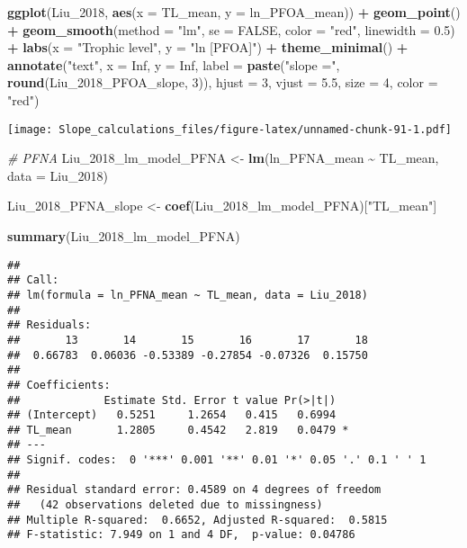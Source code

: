 \documentclass[
]{article}
\newenvironment{Shaded}{\begin{snugshade}}{\end{snugshade}}
\newcommand{\AttributeTok}[1]{\textcolor[rgb]{0.13,0.29,0.53}{#1}}
\newcommand{\CommentTok}[1]{\textcolor[rgb]{0.56,0.35,0.01}{\textit{#1}}}
\newcommand{\ConstantTok}[1]{\textcolor[rgb]{0.56,0.35,0.01}{#1}}
\newcommand{\DecValTok}[1]{\textcolor[rgb]{0.00,0.00,0.81}{#1}}
\newcommand{\FloatTok}[1]{\textcolor[rgb]{0.00,0.00,0.81}{#1}}
\newcommand{\FunctionTok}[1]{\textcolor[rgb]{0.13,0.29,0.53}{\textbf{#1}}}
\newcommand{\NormalTok}[1]{#1}
\newcommand{\OtherTok}[1]{\textcolor[rgb]{0.56,0.35,0.01}{#1}}
\newcommand{\SpecialCharTok}[1]{\textcolor[rgb]{0.81,0.36,0.00}{\textbf{#1}}}
\newcommand{\StringTok}[1]{\textcolor[rgb]{0.31,0.60,0.02}{#1}}
\begin{document}
\begin{Shaded}
\begin{Highlighting}[]
\FunctionTok{ggplot}\NormalTok{(Liu\_2018, }\FunctionTok{aes}\NormalTok{(}\AttributeTok{x =}\NormalTok{ TL\_mean, }\AttributeTok{y =}\NormalTok{ ln\_PFOA\_mean)) }\SpecialCharTok{+}
  \FunctionTok{geom\_point}\NormalTok{() }\SpecialCharTok{+}
  \FunctionTok{geom\_smooth}\NormalTok{(}\AttributeTok{method =} \StringTok{"lm"}\NormalTok{, }\AttributeTok{se =} \ConstantTok{FALSE}\NormalTok{, }\AttributeTok{color =} \StringTok{"red"}\NormalTok{, }\AttributeTok{linewidth =} \FloatTok{0.5}\NormalTok{) }\SpecialCharTok{+}
  \FunctionTok{labs}\NormalTok{(}\AttributeTok{x =} \StringTok{"Trophic level"}\NormalTok{,}
       \AttributeTok{y =} \StringTok{"ln [PFOA]"}\NormalTok{) }\SpecialCharTok{+}
  \FunctionTok{theme\_minimal}\NormalTok{() }\SpecialCharTok{+}
  \FunctionTok{annotate}\NormalTok{(}\StringTok{"text"}\NormalTok{, }\AttributeTok{x =} \ConstantTok{Inf}\NormalTok{, }\AttributeTok{y =} \ConstantTok{Inf}\NormalTok{, }\AttributeTok{label =} \FunctionTok{paste}\NormalTok{(}\StringTok{"slope ="}\NormalTok{, }\FunctionTok{round}\NormalTok{(Liu\_2018\_PFOA\_slope, }\DecValTok{3}\NormalTok{)), }
           \AttributeTok{hjust =} \DecValTok{3}\NormalTok{, }\AttributeTok{vjust =} \FloatTok{5.5}\NormalTok{, }\AttributeTok{size =} \DecValTok{4}\NormalTok{, }\AttributeTok{color =} \StringTok{"red"}\NormalTok{)}
\end{Highlighting}
\end{Shaded}

\texttt{[image: Slope\_calculations\_files/figure-latex/unnamed-chunk-91-1.pdf]}

\begin{Shaded}
\begin{Highlighting}[]
\CommentTok{\# PFNA}
\NormalTok{Liu\_2018\_lm\_model\_PFNA }\OtherTok{\textless{}{-}} \FunctionTok{lm}\NormalTok{(ln\_PFNA\_mean }\SpecialCharTok{\textasciitilde{}}\NormalTok{ TL\_mean,}
                             \AttributeTok{data =}\NormalTok{ Liu\_2018)}

\NormalTok{Liu\_2018\_PFNA\_slope }\OtherTok{\textless{}{-}} \FunctionTok{coef}\NormalTok{(Liu\_2018\_lm\_model\_PFNA)[}\StringTok{"TL\_mean"}\NormalTok{]}

\FunctionTok{summary}\NormalTok{(Liu\_2018\_lm\_model\_PFNA)}
\end{Highlighting}
\end{Shaded}

\begin{verbatim}
## 
## Call:
## lm(formula = ln_PFNA_mean ~ TL_mean, data = Liu_2018)
## 
## Residuals:
##       13       14       15       16       17       18 
##  0.66783  0.06036 -0.53389 -0.27854 -0.07326  0.15750 
## 
## Coefficients:
##             Estimate Std. Error t value Pr(>|t|)  
## (Intercept)   0.5251     1.2654   0.415   0.6994  
## TL_mean       1.2805     0.4542   2.819   0.0479 *
## ---
## Signif. codes:  0 '***' 0.001 '**' 0.01 '*' 0.05 '.' 0.1 ' ' 1
## 
## Residual standard error: 0.4589 on 4 degrees of freedom
##   (42 observations deleted due to missingness)
## Multiple R-squared:  0.6652, Adjusted R-squared:  0.5815 
## F-statistic: 7.949 on 1 and 4 DF,  p-value: 0.04786
\end{verbatim}
\end{document}
